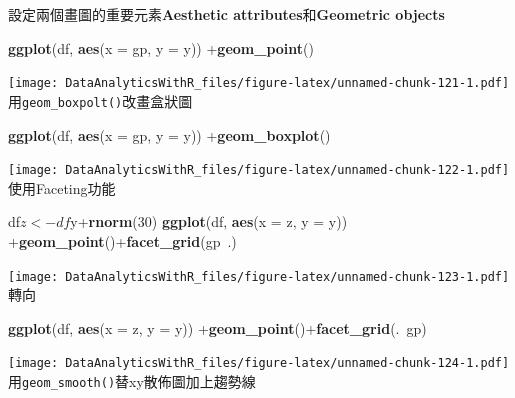 \documentclass[]{book}
\newenvironment{Shaded}{\begin{snugshade}}{\end{snugshade}}
\newcommand{\KeywordTok}[1]{\textcolor[rgb]{0.13,0.29,0.53}{\textbf{{#1}}}}
\newcommand{\DataTypeTok}[1]{\textcolor[rgb]{0.13,0.29,0.53}{{#1}}}
\newcommand{\DecValTok}[1]{\textcolor[rgb]{0.00,0.00,0.81}{{#1}}}
\newcommand{\NormalTok}[1]{{#1}}
\theoremstyle{definition}
\theoremstyle{definition}
\theoremstyle{remark}
\begin{document}
設定兩個畫圖的重要元素\textbf{Aesthetic attributes}和\textbf{Geometric
objects}

\begin{Shaded}
\begin{Highlighting}[]
\KeywordTok{ggplot}\NormalTok{(df, }\KeywordTok{aes}\NormalTok{(}\DataTypeTok{x =} \NormalTok{gp, }\DataTypeTok{y =} \NormalTok{y)) +}\KeywordTok{geom_point}\NormalTok{()}
\end{Highlighting}
\end{Shaded}

\texttt{[image: DataAnalyticsWithR\_files/figure-latex/unnamed-chunk-121-1.pdf]}
用\texttt{geom\_boxpolt()}改畫盒狀圖

\begin{Shaded}
\begin{Highlighting}[]
\KeywordTok{ggplot}\NormalTok{(df, }\KeywordTok{aes}\NormalTok{(}\DataTypeTok{x =} \NormalTok{gp, }\DataTypeTok{y =} \NormalTok{y)) +}\KeywordTok{geom_boxplot}\NormalTok{()}
\end{Highlighting}
\end{Shaded}

\texttt{[image: DataAnalyticsWithR\_files/figure-latex/unnamed-chunk-122-1.pdf]}
使用Faceting功能

\begin{Shaded}
\begin{Highlighting}[]
\NormalTok{df$z<-df$y+}\KeywordTok{rnorm}\NormalTok{(}\DecValTok{30}\NormalTok{)}
\KeywordTok{ggplot}\NormalTok{(df, }\KeywordTok{aes}\NormalTok{(}\DataTypeTok{x =} \NormalTok{z, }\DataTypeTok{y =} \NormalTok{y)) +}\KeywordTok{geom_point}\NormalTok{()+}\KeywordTok{facet_grid}\NormalTok{(gp~.)}
\end{Highlighting}
\end{Shaded}

\texttt{[image: DataAnalyticsWithR\_files/figure-latex/unnamed-chunk-123-1.pdf]}
轉向

\begin{Shaded}
\begin{Highlighting}[]
\KeywordTok{ggplot}\NormalTok{(df, }\KeywordTok{aes}\NormalTok{(}\DataTypeTok{x =} \NormalTok{z, }\DataTypeTok{y =} \NormalTok{y)) +}\KeywordTok{geom_point}\NormalTok{()+}\KeywordTok{facet_grid}\NormalTok{(.~gp)}
\end{Highlighting}
\end{Shaded}

\texttt{[image: DataAnalyticsWithR\_files/figure-latex/unnamed-chunk-124-1.pdf]}
用\texttt{geom\_smooth()}替xy散佈圖加上趨勢線
\end{document}
